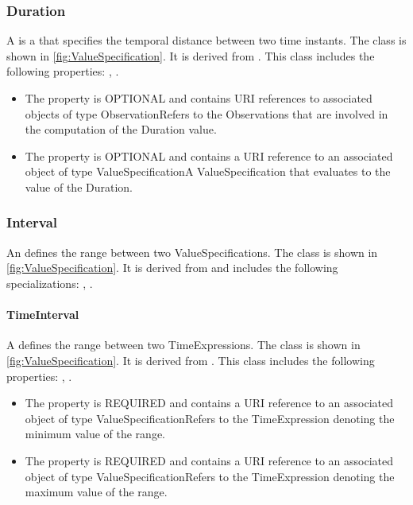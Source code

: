 \subsubsection{Duration}%
\label{sec:uml:Duration}%
A  is a  that specifies the temporal distance between two time instants.%
\newline%
\linebreak%
The  class is shown in \ref{fig:ValueSpecification}. It is derived from .%
This class includes the following properties: , . %
\begin{itemize}%
\item%
The  property is OPTIONAL and contains URI references to associated objects of type ObservationRefers to the Observations that are involved in the computation of the Duration value.%
\item%
The  property is OPTIONAL and contains a URI reference to an associated object of type ValueSpecificationA ValueSpecification that evaluates to the value of the Duration.%
\end{itemize}%
\subsubsection{Interval}%
\label{sec:uml:Interval}%
An  defines the range between two ValueSpecifications.%
\newline%
\linebreak%
The  class is shown in \ref{fig:ValueSpecification}. It is derived from  and includes the following specializations: , . %
%
\paragraph{TimeInterval}%
\label{sec:uml:TimeInterval}%
A  defines the range between two TimeExpressions.%
\newline%
\linebreak%
The  class is shown in \ref{fig:ValueSpecification}. It is derived from .%
This class includes the following properties: , . %
\begin{itemize}%
\item%
The  property is REQUIRED and contains a URI reference to an associated object of type ValueSpecificationRefers to the TimeExpression denoting the minimum value of the range.%
\item%
The  property is REQUIRED and contains a URI reference to an associated object of type ValueSpecificationRefers to the TimeExpression denoting the maximum value of the range.%
\end{itemize}%
